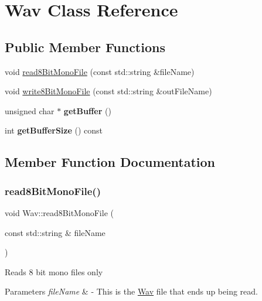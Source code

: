 \hypertarget{classWav}{}\section{Wav Class Reference}
\label{classWav}
\subsection*{Public Member Functions}
\begin{DoxyCompactItemize}
\item 
void \hyperlink{classWav_a0fed6b50045fc2092dfd19a59a186d75}{read8\+Bit\+Mono\+File} (const std\+::string \&file\+Name)
\item 
void \hyperlink{classWav_a6c6315906a2a6a42c040fa6f29dde65b}{write8\+Bit\+Mono\+File} (const std\+::string \&out\+File\+Name)
\item 
\mbox{\label{classWav_a2daf07a90ed34789e3a1874973d9bd36}} 
unsigned char $\ast$ {\bfseries get\+Buffer} ()
\item 
\mbox{\label{classWav_a71fdfa1d9f5e7c1b86f07bbff4249dca}} 
int {\bfseries get\+Buffer\+Size} () const
\end{DoxyCompactItemize}


\subsection{Member Function Documentation}
\mbox{\label{classWav_a0fed6b50045fc2092dfd19a59a186d75}} 
\subsubsection{\texorpdfstring{read8\+Bit\+Mono\+File()}{read8BitMonoFile()}}
{\footnotesize\ttfamily void Wav\+::read8\+Bit\+Mono\+File (\begin{DoxyParamCaption}\item[{const std\+::string \&}]{file\+Name }\end{DoxyParamCaption})}

Reads 8 bit mono files only 
\begin{DoxyParams}{Parameters}
{\em file\+Name} & -\/ This is the \hyperlink{classWav}{Wav} file that ends up being read. \\
\hline
\end{DoxyParams}
\mbox{\label{classWav_a6c6315906a2a6a42c040fa6f29dde65b}} 
